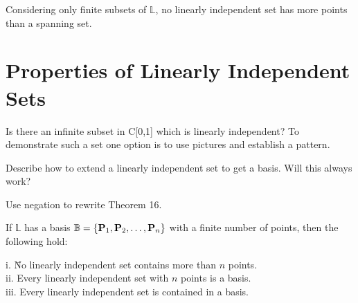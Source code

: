 \begin{theorem}
	Considering only finite subsets of $\mathbb{L}$, no linearly independent set has more points than a spanning set.
\end{theorem}
\vspace{-.3in}\hspace{5in}\begin{annotation}
\end{annotation}

\section{Properties of Linearly Independent Sets}    \label{Properties of Linearly Independent Sets}


\begin{myexa}[\bd{a}]
	Is there an infinite subset in C[0,1] which is linearly independent? To demonstrate such a set one option is to use pictures and establish a pattern.
\end{myexa}

\begin{myexb}[\bd{b}]
	Describe how to extend a linearly independent set to get a basis. Will this always work?
\end{myexb}

\begin{myexc}[\bd{c}]
	Use negation to rewrite Theorem 16. 
\end{myexc}

\begin{theorem}
	If $\mathbb{L}$ has a basis $\mathbb{B} = \{ \textbf{P}_1, \textbf{P}_2,\ldots,\textbf{P}_n \}$ with a finite number of points, then the following hold:
	\begin{tabbing}
		\indent i. \quad  \= No linearly independent set contains more than $n$ points.\\
		\indent ii.\> Every linearly independent set with $n$ points is a basis.\\ 
		\indent iii. \> Every linearly independent set is contained in a basis.
	\end{tabbing}
\end{theorem}
\vspace{-.3in}\hspace{5in}\begin{annotation}
\end{annotation}

